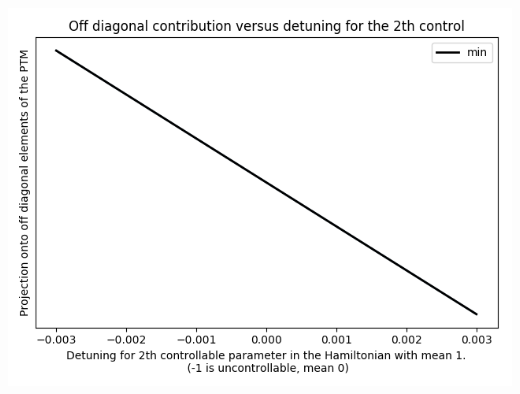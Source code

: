 \documentclass{article}
\begin{document}
\begin{center}
\includegraphics[scale=.9]{off_diag_3}

\end{center}
\end{document}
